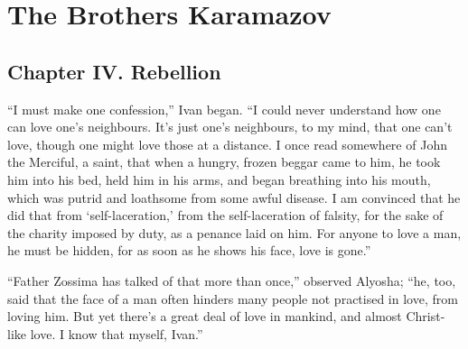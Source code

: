 
\author{Fyodor Dostoevsky}
\chapter[The Brothers Karamazov, excerpt]{The Brothers Karamazov}

\section*{Chapter IV. Rebellion}

``I must make one confession,'' Ivan began. ``I could never understand
how one can love one's neighbours. It's just one's neighbours, to my
mind, that one can't love, though one might  love those at a
distance. I once read somewhere of John the Merciful, a saint, that
when a hungry, frozen beggar came to him, he took him into his bed,
held him in his arms, and began breathing into his mouth, which was
putrid and loathsome from some awful disease. I am convinced that he
did that from `self-laceration,' from the self-laceration of falsity,
for the sake of the charity imposed by duty, as a penance laid on him.
For anyone to love a man, he must be hidden, for as soon as he shows
his face, love is gone.''

``Father Zossima has talked of that more than once,'' observed
Al\-yo\-sha; ``he, too, said that the face of a man often hinders many
people not practised in love, from loving him. But yet there's a great
deal of love in mankind, and almost Christ-like love. I know that
myself, Ivan.''

